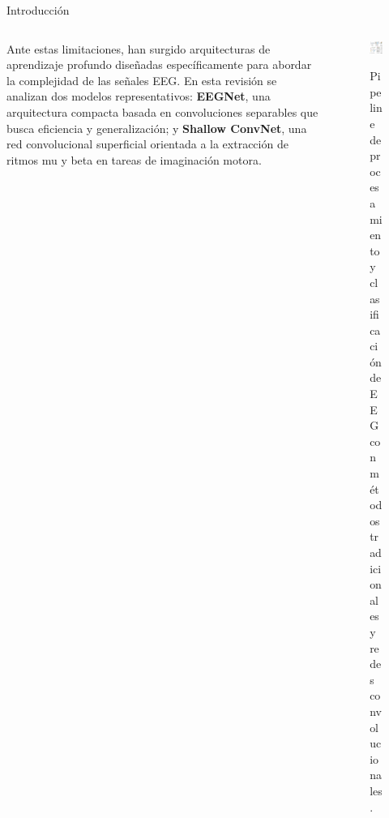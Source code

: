 \documentclass{beamer}
\begin{document}
\begin{frame}{Introducción}
\begin{columns}[T] %

    \begin{column}{0.55\textwidth}
Ante estas limitaciones, han surgido arquitecturas de aprendizaje profundo diseñadas específicamente para abordar la complejidad de las señales EEG.  
En esta revisión se analizan dos modelos representativos:  
\textbf{EEGNet}, una arquitectura compacta basada en convoluciones separables que busca eficiencia y generalización; y  
\textbf{Shallow ConvNet}, una red convolucional superficial orientada a la extracción de ritmos mu y beta en tareas de imaginación motora.
    \end{column}

    \begin{column}{0.4\textwidth}
        \begin{figure}
            \centering
            \href{https://www.mdpi.com/1424-8220/22/21/8250}{%
                \includegraphics[width=\linewidth]{sensors-22-08250-g001-550.jpg}%
            }
            \caption{\small Pipeline de procesamiento y clasificación de EEG con métodos tradicionales y redes convolucionales.}
            \label{fig:eeg_models}
        \end{figure}
    \end{column}

\end{columns}
\end{frame}
\end{document}
